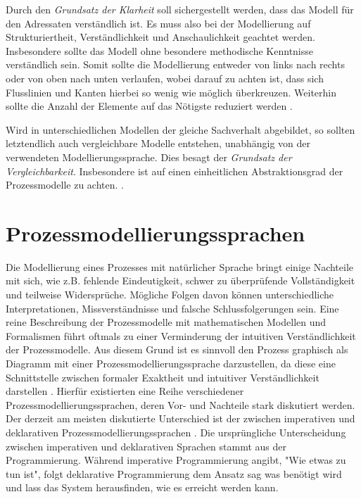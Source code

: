 Durch den \textit{Grundsatz der Klarheit} soll sichergestellt werden, dass das Modell für den Adressaten verständlich ist. Es muss also bei der Modellierung auf Strukturiertheit, Verständlichkeit und Anschaulichkeit geachtet werden. Insbesondere sollte das Modell ohne besondere methodische Kenntnisse verständlich sein. Somit sollte die Modellierung entweder von links nach rechts oder von oben nach unten verlaufen, wobei darauf zu achten ist, dass sich Flusslinien und Kanten hierbei so wenig wie möglich überkreuzen. Weiterhin sollte die Anzahl der Elemente auf das Nötigste reduziert werden \cite{leimeister2012,journals95, freund2007,reinshagen2009, becker2012prozessmanagement,koch2011,bpm07,thesis_maja}.\newline

Wird in unterschiedlichen Modellen der gleiche Sachverhalt abgebildet, so sollten letztendlich auch vergleichbare Modelle entstehen, unabhängig von der verwendeten Modellierungssprache. Dies besagt der \textit{Grundsatz der Vergleichbarkeit}. Insbesondere ist auf einen einheitlichen Abstraktionsgrad der Prozessmodelle zu achten. \cite{leimeister2012, journals95, freund2007,reinshagen2009}.\newline


\section{Prozessmodellierungssprachen}\label{sec:chapter3:Prozessmodellierungssprachen}

Die Modellierung eines Prozesses mit natürlicher Sprache bringt einige Nachteile mit sich, wie z.B. fehlende Eindeutigkeit, schwer zu überprüfende Vollständigkeit und teilweise Widersprüche. Mögliche Folgen davon können unterschiedliche Interpretationen, Missverständnisse und falsche Schlussfolgerungen sein. Eine reine Beschreibung der Prozessmodelle mit mathematischen Modellen und Formalismen führt oftmals zu einer Verminderung der intuitiven Verständlichkeit der Prozessmodelle. Aus diesem Grund ist es sinnvoll den Prozess graphisch als Diagramm mit einer Prozessmodellierungssprache darzustellen, da diese eine Schnittstelle zwischen formaler Exaktheit und intuitiver Verständlichkeit darstellen \cite{thomas2009,kircher2006}.  \newline
Hierfür existierten eine Reihe verschiedener Prozessmodellierungssprachen, deren Vor- und Nachteile stark diskutiert werden. Der derzeit am meisten diskutierte Unterschied ist der zwischen imperativen und deklarativen Prozessmodellierungssprachen \cite{fahland2009}. \newline
Die ursprüngliche Unterscheidung zwischen imperativen und deklarativen Sprachen stammt aus der Programmierung. Während imperative Programmierung angibt, "Wie etwas zu tun ist", folgt deklarative Programmierung dem Ansatz \grqq sag was benötigt wird und lass das System herausfinden, wie es erreicht werden kann\grqq \cite{pichler2012}.

